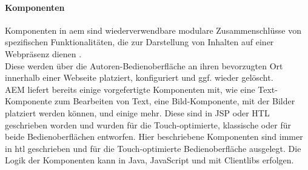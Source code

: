 \paragraph{Komponenten}
\label{sec:komponenten}
Komponenten in \ac{aem} sind wiederverwendbare modulare Zusammenschlüsse von spezifischen Funktionalitäten, die zur Darstellung von Inhalten auf einer Webpräsenz dienen \cite{Adobe2016a}. \\
Diese werden über die Autoren-Bedienoberfläche an ihren bevorzugten Ort innerhalb einer Webseite platziert, konfiguriert und ggf. wieder gelöscht. \\
AEM liefert bereits einige vorgefertigte Komponenten mit, wie eine Text-Komponente zum Bearbeiten von Text, eine Bild-Komponente, mit der Bilder platziert werden können, und einige mehr. Diese sind in JSP oder HTL geschrieben worden und wurden für die Touch-optimierte, klassische oder für beide Bedienoberflächen entworfen. Hier beschriebene Komponenten sind immer in \ac{htl} geschrieben und für die Touch-optimierte Bedienoberfläche ausgelegt. Die Logik der Komponenten kann in Java, JavaScript und mit Clientlibs erfolgen.